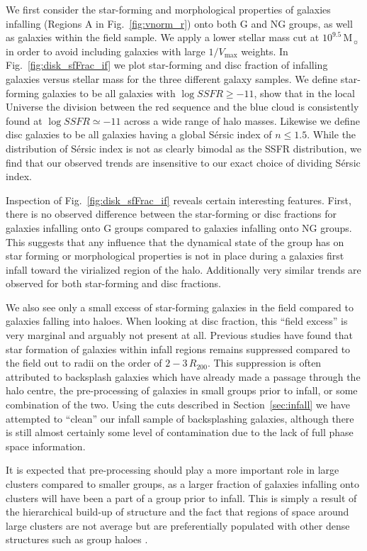 \documentclass[a4paper,fleqn,usenatbib]{mnras}
\newcommand{\Msun}{\,\mathrm{M_{\sun}}}
\begin{document}
We first consider the star-forming and morphological properties of
galaxies infalling (Regions A in Fig.~\ref{fig:vnorm_r}) onto both G
and NG groups, as well as galaxies within the field sample.  We apply
a lower stellar mass cut at $10^{9.5}\Msun$ in order to avoid
including galaxies with large $1/V_\mathrm{max}$ weights.  In
Fig.~\ref{fig:disk_sfFrac_if} we plot star-forming and disc fraction
of infalling galaxies
versus stellar mass for the three different galaxy samples.  We define
star-forming galaxies to be all galaxies with $\log SSFR \ge -11$,
\citet{wetzel2012} show that in the local Universe the division
between the red sequence and the blue cloud is consistently found at
$\log SSFR \simeq -11$ across a wide range of halo masses.  Likewise
we define disc galaxies to be all galaxies having a global S\'{e}rsic
index of $n \le 1.5$.  While the distribution of S\'{e}rsic index is
not as clearly bimodal as the SSFR distribution, we find that our
observed trends are insensitive to our exact choice of dividing S\'{e}rsic
index.
\par
Inspection of Fig.~\ref{fig:disk_sfFrac_if} reveals certain
interesting features.  First, there is no observed difference
between the star-forming or disc fractions for galaxies infalling onto
G groups compared to galaxies infalling onto NG
groups.  This suggests that any influence that the dynamical state
of the group
has on star forming or morphological properties is not in place during
a galaxies first infall toward the virialized region of the halo.
Additionally very similar trends are observed for both star-forming and
disc fractions.
\par
We also see only a small excess of star-forming galaxies in the field
compared to galaxies falling into haloes.  When looking at disc fraction, this
``field excess'' is very marginal and arguably not present at all.
Previous studies \citep{lewis2002, gray2004, rines2005, verdugo2008}
have found that star formation of galaxies within infall regions
remains suppressed compared to the field out to radii on the order of
$2-3\,R_{200}$.  This suppression is often attributed to
backsplash galaxies which have already made a passage through the halo
centre, the pre-processing of galaxies in small groups prior to
infall, or some combination of the two.  Using the cuts described in
Section~\ref{sec:infall} we have attempted to ``clean'' our infall sample
of backsplashing galaxies, although there is still almost certainly
some level of contamination due to the lack of full phase space information.
\par
It is expected that pre-processing
should play a more important role in large clusters compared to smaller
groups, as a larger fraction of galaxies infalling onto clusters will
have been a part of a group prior to infall.  This is
simply a result of the hierarchical build-up of structure and the
fact that regions of space around large clusters are not average but
are preferentially populated with other dense structures such as group
haloes \citep[e.g.][]{mo1996, wang2008}.
\end{document}
